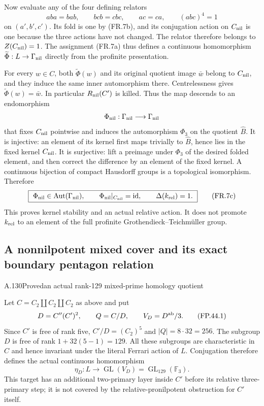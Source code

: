 Now evaluate any of the four defining relators
\[
 aba=bab,\qquad bcb=cbc,\qquad ac=ca,\qquad(abc)^4=1
\]
on $(a',b',c')$. Its fold is one by (FR.7b), and its
conjugation action on $C_{\rm nil}$ is one because the
three actions have not changed. The relator therefore
belongs to $Z(C_{\rm nil})=1$. The assignment (FR.7a)
thus defines a continuous homomorphism
$\widetilde\Phi:L\to\Gamma_{\rm nil}$ directly from
the profinite presentation.

For every $w\in C$, both $\widetilde\Phi(w)$ and its
original quotient image $\bar w$ belong to $C_{\rm nil}$,
and they induce the same inner automorphism there.
Centrelessness gives $\widetilde\Phi(w)=\bar w$.
In particular $R_{\rm nil}(C')$ is killed. Thus the map
descends to an endomorphism
\[
            \Phi_{\rm nil}:\Gamma_{\rm nil}
                         \longrightarrow\Gamma_{\rm nil}
\]
that fixes $C_{\rm nil}$ pointwise and induces the
automorphism $\Phi_3$ on the quotient $\widehat B$.
It is injective: an element of its kernel first maps
trivially to $\widehat B$, hence lies in the fixed kernel
$C_{\rm nil}$. It is surjective: lift a preimage under
$\Phi_3$ of the desired folded element, and then correct
the difference by an element of the fixed kernel.
A continuous bijection of compact Hausdorff groups is
a topological isomorphism. Therefore
\[
 \boxed{\ \Phi_{\rm nil}\in\operatorname{Aut}(\Gamma_{\rm nil}),
 \qquad\Phi_{\rm nil}|_{C_{\rm nil}}=\operatorname{id},
 \qquad\Delta(k_{\rm rel})=1.\ }
 \tag{FR.7c}
\]
This proves kernel stability and an actual relative action.
It does not promote $k_{\rm rel}$ to an element of the
full profinite Grothendieck--Teichm\"uller group.

\subsection{A nonnilpotent mixed cover and its exact boundary pentagon relation}


\begin{statement}{A.130}{Proved}{an actual rank-129 mixed-prime homology quotient}
\end{statement}
Let $C=C_2\amalg C_2\amalg C_2$ as above and put
\[
 D=C''(C')^2,\qquad Q=C/D,
 \qquad V_D=D^{\rm ab}/3.
 \tag{FP.44.1}
\]
Since $C'$ is free of rank five, $C'/D=(C_2)^5$ and
$|Q|=8\cdot32=256$. The subgroup $D$ is free of rank
$1+32(5-1)=129$. All these subgroups are characteristic
in $C$ and hence invariant under the literal Ferrari action
of $L$. Conjugation therefore defines the actual continuous
homomorphism
\[
           \eta_D:L\longrightarrow
                    \operatorname{GL}(V_D)
                    =\operatorname{GL}_{129}(\mathbb F_3).
 \tag{FP.44.2}
\]
This target has an additional two-primary layer inside $C'$
before its relative three-primary step; it is not covered by
the relative-pronilpotent obstruction for $C'$ itself.


